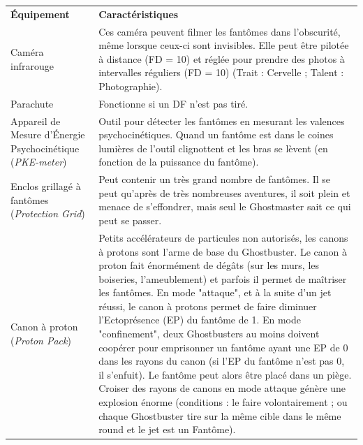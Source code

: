 \begin{frame}[b]
{\begin{center}
\begin{tabular}{>{\raggedright\arraybackslash}p{1.8cm} p{6cm}}
\textbf{Équipement} & \textbf{Caractéristiques}\\
Caméra infrarouge & Ces caméra peuvent filmer les fantômes dans l'obscurité, même lorsque ceux-ci sont invisibles. Elle peut être pilotée à distance (FD = 10) et réglée pour prendre des photos à intervalles réguliers (FD = 10) (Trait : Cervelle ; Talent : Photographie). \\
Parachute & Fonctionne si un DF n'est pas tiré. \\
Appareil de Mesure d'Énergie Psychocinétique (\textit{PKE-meter}) & Outil pour détecter les fantômes en mesurant les valences psychocinétiques. Quand un fantôme est dans le coines lumières de l'outil clignottent et les bras se lèvent (en fonction de la puissance du fantôme). \\
Enclos grillagé à fantômes (\textit{Protection Grid}) & Peut contenir un très grand nombre de fantômes. Il se peut qu'après de très nombreuses aventures, il soit plein et menace de s'effondrer, mais seul le Ghostmaster sait ce qui peut se passer. \\
Canon à proton (\textit{Proton Pack}) & Petits accélérateurs de particules non autorisés, les canons à protons sont l'arme de base du Ghostbuster. Le canon à proton fait énormément de dégâts (sur les murs, les boiseries, l'ameublement) et parfois il permet de maîtriser les fantômes. En mode "attaque", et à la suite d'un jet réussi, le canon à protons  permet de faire diminuer l'Ectoprésence (EP) du fantôme de 1. En mode "confinement", deux Ghostbusters au moins doivent coopérer pour emprisonner un fantôme ayant une EP de 0 dans les rayons du canon (si l'EP du fantôme n'est pas 0, il s'enfuit). Le fantôme peut alors être placé dans un piège. \newline Croiser des rayons de canons en mode attaque génère une explosion énorme (conditions : le faire volontairement ; ou chaque Ghostbuster tire sur la même cible dans le même round et le jet est un Fantôme). \\
\end{tabular}
\end{center}

}
\end{frame}
